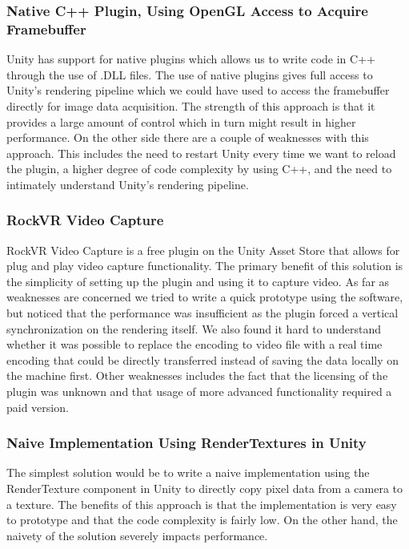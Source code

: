 \subsubsection{Native C++ Plugin, Using OpenGL Access to Acquire Framebuffer}
Unity has support for native plugins\cite{unity_native_plugin} which allows us to write code in C++ through the use of .DLL files. The use of native plugins gives full access to Unity's rendering pipeline which we could have used to access the framebuffer directly for image data acquisition. The strength of this approach is that it provides a large amount of control which in turn might result in higher performance. On the other side there are a couple of weaknesses with this approach. This includes the need to restart Unity every time we want to reload the plugin, a higher degree of code complexity by using C++, and the need to intimately understand Unity's rendering pipeline.  

\subsubsection{RockVR Video Capture}
RockVR Video Capture\cite{unity_asset_store_rockvr} is a free plugin on the Unity Asset Store that allows for plug and play video capture functionality. The primary benefit of this solution is the simplicity of setting up the plugin and using it to capture video. As far as weaknesses are concerned we tried to write a quick prototype using the software, but noticed that the performance was insufficient as the plugin forced a vertical synchronization on the rendering itself. We also found it hard to understand whether it was possible to replace the encoding to video file with a real time encoding that could be directly transferred instead of saving the data locally on the machine first. Other weaknesses includes the fact that the licensing of the plugin was unknown and that usage of more advanced functionality required a paid version. 

\subsubsection{Naive Implementation Using RenderTextures in Unity}
The simplest solution would be to write a naive implementation using the RenderTexture\cite{unity_renderTexture} component in Unity to directly copy pixel data from a camera to a texture. The benefits of this approach is that the implementation is very easy to prototype and that the code complexity is fairly low. On the other hand, the naivety of the solution severely impacts performance.  

